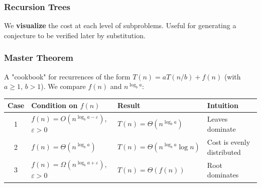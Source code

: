 \subsubsection{Recursion Trees}

We \textbf{visualize} the cost at each level of subproblems. Useful for generating
a conjecture to be verified later by substitution.

\begin{center}
\quad
{}
\end{center}

\subsubsection{Master Theorem}

A "cookbook" for recurrences of the form $T(n) = aT(n/b) + f(n)$
(with $a \ge 1$, $b > 1$). We compare $f(n)$ and $n^{\log_b a}$:

\begin{center}
\renewcommand{\arraystretch}{1.5}
\begin{tabular}{clll}
\toprule
\textbf{Case} & \textbf{Condition on $f(n)$} & \textbf{Result} & \textbf{Intuition} \\
\midrule
1 & $f(n) = O\!\left(n^{\log_b a - \varepsilon}\right)$, $\varepsilon>0$
  & $T(n) = \Theta\!\left(n^{\log_b a}\right)$
  & Leaves dominate \\
2 & $f(n) = \Theta\!\left(n^{\log_b a}\right)$
  & $T(n) = \Theta\!\left(n^{\log_b a}\log n\right)$
  & Cost is evenly distributed \\
3 & $f(n) = \Omega\!\left(n^{\log_b a + \varepsilon}\right)$, $\varepsilon>0$
  & $T(n) = \Theta(f(n))$
  & Root dominates \\
\bottomrule
\end{tabular}
\end{center}

